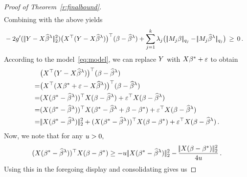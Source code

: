 \documentclass[bj]{imsart}
\newcommand{\normtwo}[1]{\ensuremath{\!|\!| #1 | \! |_{2}}}
\newcommand{\normqj}[1]{\ensuremath{\!|\!| #1 | \! |_{q_j}}}
\newcommand{\1}{{\rm 1}\mskip -4,5mu{\rm l} }
\newcommand{\betatrue}{\beta^*}
\newcommand{\genbeta}{\textcolor{black}{\beta}}
\newcommand{\genconstant}{\textcolor{black}{\ensuremath{u}}}
\begin{document}
\begin{proof}[Proof of Theorem~\ref{r:finalbound}]
\begin{align*}
\end{align*}
Combining with the above yields
\begin{align*}
&-2g'(\,\normtwo{\outcome-\design\estimatort}^2) \big(\design^\top(\outcome-\design\estimatort)\big)^\top(\genbeta-\estimatort)
+\sum_{j=1}^{\numbergroups}\lambda_j\big(\,\normqj{ \fusedmatrix_j \genbeta}-\normqj{ \fusedmatrix_j\estimatort}\big)\,\geq\,0 \,. 
\end{align*}
According to the model~\eqref{eq:model}, we can replace $\textcolor{black}{Y}$ with  $\design\betatrue+\noise$ to obtain
\begin{align*}
&\big(\design^\top(\outcome-\design\estimatort)\big)^\top(\genbeta-\estimatort)\\
 =&\big(\design^\top(\design\betatrue+\noise-\design\estimatort)\big)^\top(\genbeta-\estimatort)\\
 = &(\design(\betatrue-\estimatort))^\top \design(\genbeta-\estimatort)+\noise^\top \design(\genbeta-\estimatort)\\
= &(\design(\betatrue-\estimatort))^\top \design(\betatrue-\estimatort+\genbeta-\betatrue)+\noise^\top \design(\genbeta-\estimatort)\\
 =& \,\normtwo{\design(\betatrue-\estimatort)}^2+ (\design(\betatrue-\estimatort))^\top \design(\genbeta-\betatrue)+ \noise^\top \design(\genbeta-\estimatort)\,.
\end{align*}
Now, we note that for any $\genconstant>0,$
  \begin{equation*}   
 (\design(\betatrue-\estimatort))^\top \design(\genbeta-\betatrue)
\geq -\genconstant\,\normtwo{\design(\betatrue-\estimatort)}^2-\frac{\normtwo{\design(\genbeta-\betatrue)}^2}{4\genconstant}\,.
  \end{equation*}
Using this in the foregoing display and consolidating gives us

\end{proof}
\end{document}
